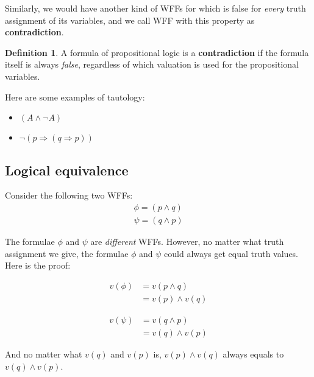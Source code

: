 \documentclass[11pt]{article}
\theoremstyle{definition}
\newtheorem{defn}{Definition}[subsection]
\begin{document}
Similarly, we would have another kind of WFFs for which is false for \textit{every} truth assignment of its variables, and we call WFF with this property as \textbf{contradiction}.

\begin{shaded}
\begin{defn}
    A formula of propositional logic is a \textbf{contradiction} if the formula itself is always \textit{false}, regardless of which valuation is used for the propositional variables. 
\end{defn}
\end{shaded}

Here are some examples of tautology:
\begin{itemize}
    \item $(A \wedge \neg A)$
    \item $\neg (p \Rightarrow (q \Rightarrow p))$
\end{itemize}

\subsection{Logical equivalence}
Consider the following two WFFs:
\begin{gather}
    \phi = (p \wedge q)\\
    \psi = (q \wedge p)
\end{gather}

The formulae $\phi$ and $\psi$ are \textit{different} WFFs. However, no matter what truth assignment we give, the formulae $\phi$ and $\psi$ could always get equal truth values. Here is the proof:

\begin{equation}
    \begin{split}
        v(\phi) &= v(p \wedge q)\\
                &= v(p) \wedge v(q)
    \end{split}
\end{equation}

\begin{equation}
    \begin{split}
        v(\psi) &= v(q \wedge p)\\
                &= v(q) \wedge v(p)
    \end{split}
\end{equation}

And no matter what $v(q)$ and $v(p)$ is, $v(p) \wedge v(q)$ always equals to $v(q) \wedge v(p)$.
\end{document}
